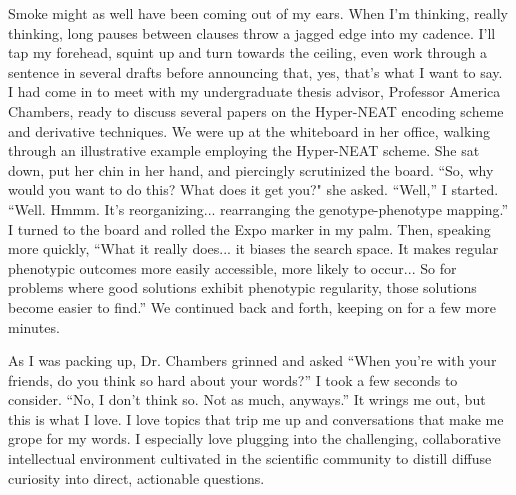 Smoke might as well have been coming out of my ears.
When I'm thinking, really thinking, long pauses between clauses throw a jagged edge into my cadence.
I'll tap my forehead, squint up and turn towards the ceiling, even work through a sentence in several drafts before announcing that, yes, that's what I want to say.
I had come in to meet with my undergraduate thesis advisor, Professor America Chambers, ready to discuss several papers on the Hyper-NEAT encoding scheme and derivative techniques.
We were up at the whiteboard in her office, walking through an illustrative example employing the Hyper-NEAT scheme.
She sat down, put her chin in her hand, and piercingly scrutinized the board.
``So, why would you want to do this? What does it get you?" she asked.
``Well,'' I started.
``Well.
Hmmm.
It's reorganizing... rearranging the genotype-phenotype mapping.''
I turned to the board and rolled the Expo marker in my palm.
Then, speaking more quickly,
``What it really does... it biases the search space.
It makes regular phenotypic outcomes more easily accessible, more likely to occur...
So for problems where good solutions exhibit phenotypic regularity, those solutions become easier to find.''
We continued back and forth, keeping on for a few more minutes.

As I was packing up, Dr. Chambers grinned and asked ``When you're with your friends, do you think so hard about your words?''
I took a few seconds to consider.
``No, I don't think so.
Not as much, anyways.''
It wrings me out, but this is what I love.
I love topics that trip me up and conversations that make me grope for my words.
I especially love plugging into the challenging, collaborative intellectual environment cultivated in the scientific community to distill diffuse curiosity into direct, actionable questions.

